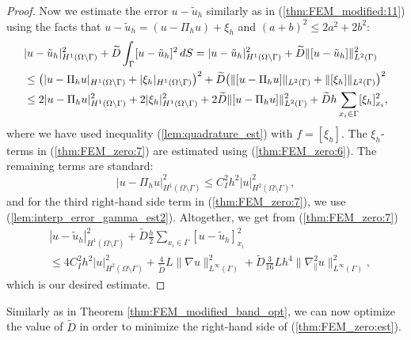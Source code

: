 \documentclass{article}
\theoremstyle{remark}
\def \d {{\rm d}}
\def\dS{\,\d S }
\def\tu{\tilde{u}}
\def\gradt{\nabla_{\!\!{\scriptscriptstyle\parallel}}}
\def\tD{\widetilde{D}}
\begin{document}
\begin{proof}
Now we estimate the error $u-\tu_h$ similarly as in (\ref{thm:FEM_modified:11}) using the facts that $u-\tu_h =(u-\Pi_h u)+\xi_h$ and $(a+b)^2\leq 2a^2+2b^2$:
\begin{equation}
\begin{split}
\label{thm:FEM_zero:7}
&|u-\tu_h|^2_{H^1(\Omega\setminus\Gamma)} +\tD\int_{\Gamma}[u-\tu_h]^2\dS =|u-\tu_h|^2_{H^1(\Omega\setminus\Gamma)} +\tD\|[u-\tu_h]\|_{L^2(\Gamma)}^2\\ &\leq \big(|u-\Pi_h u|_{H^1(\Omega\setminus\Gamma)} + |\xi_h|_{H^1(\Omega\setminus\Gamma)}\big)^2 +\tD\big(\|[u-\Pi_h u]\|_{L^2(\Gamma)}+\|[\xi_h]\|_{L^2(\Gamma)}\big)^2\\
&\leq 2|u-\Pi_h u|_{H^1(\Omega\setminus\Gamma)}^2 + 2|\xi_h|_{H^1(\Omega\setminus\Gamma)}^2 +2\tD\|[u-\Pi_h u]\|_{L^2(\Gamma)}^2 +\tD h\sum_{x_i\in\Gamma}[\xi_h]_{x_i}^2,
\end{split}
\end{equation}
where we have used inequality (\ref{lem:quadrature_est}) with $f=[\xi_h]$. The $\xi_h$-terms in (\ref{thm:FEM_zero:7}) are estimated using (\ref{thm:FEM_zero:6}). The remaining terms are standard:
\begin{equation}
\label{thm:FEM_zero:8}
|u-\Pi_h u|_{H^1(\Omega\setminus\Gamma)}^2\leq C_I^2h^2|u|^2_{H^2(\Omega\setminus\Gamma)},
\end{equation}
and for the third right-hand side term in (\ref{thm:FEM_zero:7}), we use (\ref{lem:interp_error_gamma_est2}). Altogether, we get from (\ref{thm:FEM_zero:7}) 
\begin{equation}
\begin{split}
\label{thm:FEM_zero:9}
&|u-\tu_h|^2_{H^1(\Omega\setminus\Gamma)} +\tD\frac{h}{2}\sum_{x_i\in\Gamma}[u-\tu_h]_{x_i}^2\\ 
& \leq 4 C_I^2h^2|u|^2_{H^2(\Omega\setminus\Gamma)} +\frac{4}{\tD}L\|\nabla u\|^2_{L^\infty(\Gamma)}  +\tD\frac{3}{16}L h^4 \|\gradt^2 u\|_{L^\infty(\Gamma)}^2,
\end{split}
\end{equation}
which is our desired estimate.
\end{proof}

Similarly as in Theorem \ref{thm:FEM_modified_band_opt}, we can now  optimize the value of $\tD$ in order to minimize the right-hand side of (\ref{thm:FEM_zero:est}).
\end{document}
